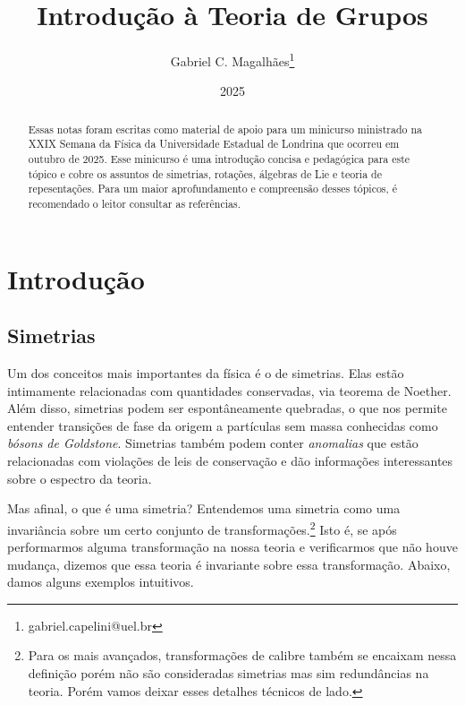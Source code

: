 \documentclass{article}
\title{Introdução à Teoria de Grupos}
\author{Gabriel C. Magalhães\footnote{gabriel.capelini@uel.br}}
\date{2025}
\numberwithin{equation}{section}
\numberwithin{figure}{section}
\begin{document}
\maketitle

\begin{abstract}
Essas notas foram escritas como material de apoio para um minicurso ministrado na XXIX Semana da Física da Universidade Estadual de Londrina que ocorreu em outubro de 2025. Esse minicurso é uma introdução concisa e pedagógica para este tópico e cobre os assuntos de simetrias, rotações, álgebras de Lie e teoria de repesentações. Para um maior aprofundamento e compreensão desses tópicos, é recomendado o leitor consultar as referências. 
\end{abstract}

\tableofcontents
\pagebreak

\section{Introdução}
\subsection{Simetrias}
Um dos conceitos mais importantes da física é o de simetrias. Elas estão intimamente relacionadas com quantidades conservadas, via teorema de Noether\cite{lemos2007mecânica}. Além disso, simetrias podem ser espontâneamente quebradas, o que nos permite entender transições de fase da origem a partículas sem massa conhecidas como \textit{bósons de Goldstone}\cite{Beekman_2019}. Simetrias também podem conter \textit{anomalias}\cite{Arouca_2022} que estão relacionadas com violações de leis de conservação e dão informações interessantes sobre o espectro da teoria. 


Mas afinal, o que é uma simetria? Entendemos uma simetria como uma invariância sobre um certo conjunto de transformações.\footnote{Para os mais avançados, transformações de calibre também se encaixam nessa definição porém não são consideradas simetrias mas sim redundâncias na teoria. Porém vamos deixar esses detalhes técnicos de lado.} Isto é, se após performarmos alguma transformação na nossa teoria e verificarmos que não houve mudança, dizemos que essa teoria é invariante sobre essa transformação. Abaixo, damos alguns exemplos intuitivos. 
\end{document}
